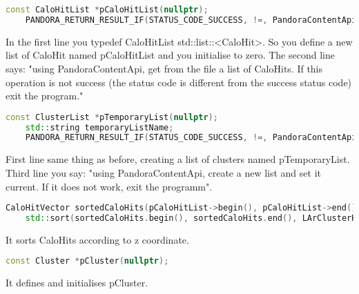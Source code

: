 \begin{lstlisting}[language=C++]
	const CaloHitList *pCaloHitList(nullptr);
	PANDORA_RETURN_RESULT_IF(STATUS_CODE_SUCCESS, !=, PandoraContentApi::GetCurrentList(*this, pCaloHitList));
\end{lstlisting}
In the first line you typedef CaloHitList std::list::<CaloHit>. So you define a new list of CaloHit named pCaloHitList and you initialise to zero. The second line says: "using PandoraContentApi, get from the file a list of CaloHits. If this operation is not success (the status code is different from the success status code) exit the program."

\begin{lstlisting}[language=C++]	
	const ClusterList *pTemporaryList(nullptr);
	std::string temporaryListName;
	PANDORA_RETURN_RESULT_IF(STATUS_CODE_SUCCESS, !=, PandoraContentApi::CreateTemporaryListAndSetCurrent(*this, pTemporaryList, temporaryListName));
\end{lstlisting}

First line same thing as before, creating a list of clusters named pTemporaryList. Third line you say: "using PandoraContentApi, create a new list and set it current. If it does not work, exit the programm".

\begin{lstlisting}[language=C++]
	CaloHitVector sortedCaloHits(pCaloHitList->begin(), pCaloHitList->end());
	std::sort(sortedCaloHits.begin(), sortedCaloHits.end(), LArClusterHelper::SortHitsByPosition);
\end{lstlisting}

It sorts CaloHits according to z coordinate.

\begin{lstlisting}[language=C++]
const Cluster *pCluster(nullptr);
\end{lstlisting}

It defines and initialises pCluster.

